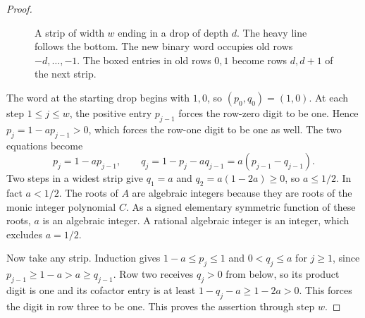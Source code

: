 \documentclass[11pt,reqno]{amsart}
\begin{document}
\begin{proof}
\begin{figure}[ht]
\centering
{}
\caption{A strip of width $w$ ending in a drop of depth $d$. The heavy line follows the bottom. The new binary word occupies old rows $-d,\ldots,-1$. The boxed entries in old rows $0,1$ become rows $d,d+1$ of the next strip.}\label{fig:shared-column}
\end{figure}

The word at the starting drop begins with \(1,0\), so \((p_0,q_0)=(1,0)\). At each step \(1\le j\le w\), the positive entry \(p_{j-1}\) forces the row-zero digit to be one. Hence \(p_j=1-a p_{j-1}>0\), which forces the row-one digit to be one as well. The two equations become
\[
 p_j=1-a p_{j-1},\qquad q_j=1-p_j-aq_{j-1}=a(p_{j-1}-q_{j-1}).
\]
Two steps in a widest strip give \(q_1=a\) and \(q_2=a(1-2a)\ge0\), so \(a\le1/2\). In fact \(a<1/2\). The roots of \(A\) are algebraic integers because they are roots of the monic integer polynomial \(C\). As a signed elementary symmetric function of these roots, \(a\) is an algebraic integer. A rational algebraic integer is an integer, which excludes \(a=1/2\).

Now take any strip. Induction gives \(1-a\le p_j\le1\) and \(0<q_j\le a\) for \(j\ge1\), since \(p_{j-1}\ge1-a>a\ge q_{j-1}\). Row two receives \(q_j>0\) from below, so its product digit is one and its cofactor entry is at least \(1-q_j-a\ge1-2a>0\). This forces the digit in row three to be one. This proves the assertion through step \(w\).
\end{proof}
\end{document}
